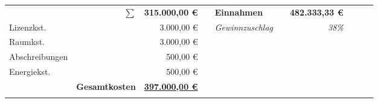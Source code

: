 \begin{sidewaystable}
\begin{tabular}{llrlllrlll}
\multicolumn{1}{|l}{}                      & \multicolumn{1}{r|}{$\sum$}                          & \multicolumn{1}{r|}{\textbf{315.000,00 \euro}}       & \multicolumn{1}{l|}{} & \textbf{Einnahmen}       & \multicolumn{1}{r}{\textbf{}}                & \multicolumn{1}{r|}{\textbf{482.333,33 \euro}}       &  &  &  \\
\multicolumn{1}{|l}{Lizenzkst.}            & \multicolumn{1}{l|}{}                           & \multicolumn{1}{r|}{3.000,00 \euro}                  & \multicolumn{1}{l|}{} & \textit{Gewinnzuschlag}  & \multicolumn{1}{r}{\textit{}}                & \multicolumn{1}{r|}{\textit{38\%}}               &  &  &  \\ \cline{5-7}
\multicolumn{1}{|l}{Raumkst.}              & \multicolumn{1}{l|}{}                           & \multicolumn{1}{r|}{3.000,00 \euro}                  &                       &                          &                                              & \multicolumn{1}{l}{}                             &  &  &  \\
\multicolumn{1}{|l}{Abschreibungen}        & \multicolumn{1}{l|}{}                           & \multicolumn{1}{r|}{500,00 \euro}                    &                       &                          &                                              & \multicolumn{1}{l}{}                             &  &  &  \\
\multicolumn{1}{|l}{Energiekst.}           & \multicolumn{1}{l|}{}                           & \multicolumn{1}{r|}{500,00 \euro}                    &                       &                          &                                              & \multicolumn{1}{l}{}                             &  &  &  \\ \cline{1-3}
\multicolumn{1}{|l}{}                      & \multicolumn{1}{r|}{\textbf{Gesamtkosten}}      & \multicolumn{1}{r|}{{\ul \textbf{397.000,00 \euro}}} &                       &                          &                                              & \multicolumn{1}{l}{}                             &  &  &  \\ \cline{1-3}
                                           &                                                 & \multicolumn{1}{l}{}                             &                       &                          &                                              & \multicolumn{1}{l}{}                             &  &  & 
\end{tabular}
\end{sidewaystable} 